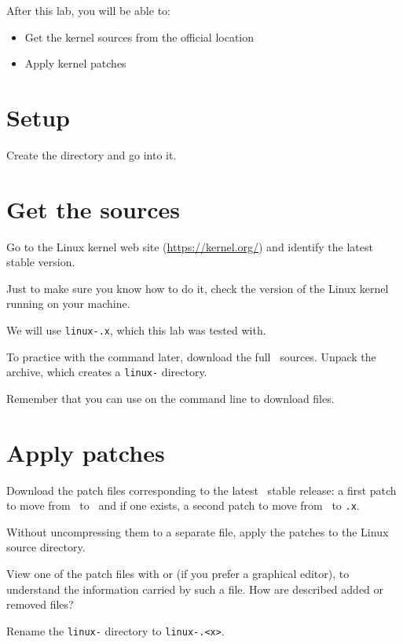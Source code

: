 
After this lab, you will be able to:
\begin{itemize}
\item Get the kernel sources from the official location
\item Apply kernel patches
\end{itemize}

\section{Setup}

Create the  directory and go into it.

\section{Get the sources}

Go to the Linux kernel web site (\url{https://kernel.org/}) and
identify the latest stable version.

Just to make sure you know how to do it, check the version of the
Linux kernel running on your machine.

We will use \texttt{linux-\workingkernel.x}, which this lab was tested with.

To practice with the  command later, download the full \texttt\basekernel\
sources. Unpack the archive, which creates a \texttt{linux-\basekernel}
directory.

Remember that you can use  on the command
line to download files.

\section{Apply patches}

Download the patch files corresponding to the latest \texttt\workingkernel\ stable
release: a first patch to move from \texttt\basekernel\ to
\texttt\workingkernel\ and if one exists, a second patch to move from
\texttt\workingkernel\ to \texttt{\workingkernel.x}.

Without uncompressing them to a separate file, apply the patches to the Linux
source directory.


View one of the patch files with  or 
(if you prefer a graphical editor), to understand the information carried
by such a file. How are described added or removed files?

Rename the \texttt{linux-\basekernel} directory to \texttt{linux-\workingkernel.<x>}.
